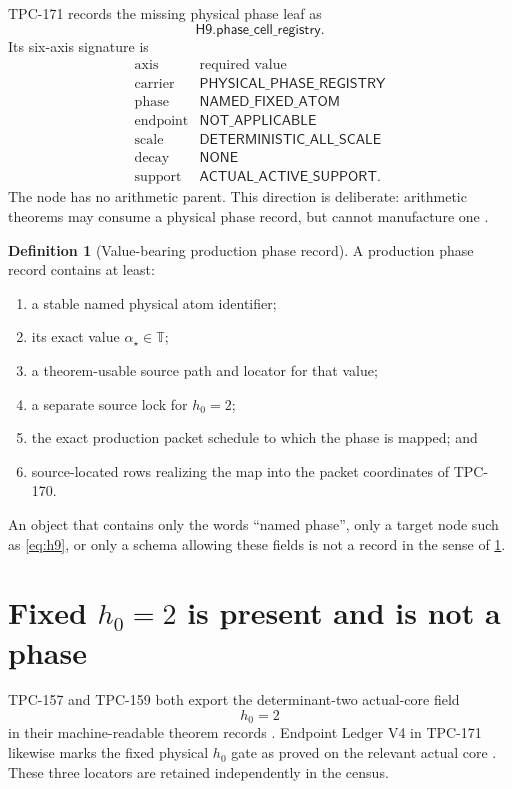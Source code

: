 \documentclass[11pt]{article}
\theoremstyle{definition}
\newtheorem{definition}[theorem]{Definition}
\theoremstyle{remark}
\newcommand{\T}{\mathbb T}
\begin{document}
TPC-171 records the missing physical phase leaf as
\[
 \mathsf{H9.phase\_cell\_registry}.
\tag{1}\label{eq:h9}
\]
Its six-axis signature is
\[
\begin{array}{c|c}
\text{axis}&\text{required value}\\
\hline
\text{carrier}&\mathsf{PHYSICAL\_PHASE\_REGISTRY}\\
\text{phase}&\mathsf{NAMED\_FIXED\_ATOM}\\
\text{endpoint}&\mathsf{NOT\_APPLICABLE}\\
\text{scale}&\mathsf{DETERMINISTIC\_ALL\_SCALE}\\
\text{decay}&\mathsf{NONE}\\
\text{support}&\mathsf{ACTUAL\_ACTIVE\_SUPPORT}.
\end{array}
\tag{2}\label{eq:signature}
\]
The node has no arithmetic parent.  This direction is deliberate:
arithmetic theorems may consume a physical phase record, but cannot
manufacture one \citep{WangTPC161,WangTPC171}.

\begin{definition}[Value-bearing production phase record]
\label{def:record}
A production phase record contains at least:
\begin{enumerate}[label=(\roman*),leftmargin=2.2em]
\item a stable named physical atom identifier;
\item its exact value \(\alpha_\star\in\T\);
\item a theorem-usable source path and locator for that value;
\item a separate source lock for \(h_0=2\);
\item the exact production packet schedule to which the phase is
  mapped; and
\item source-located rows realizing the map into the packet
  coordinates of TPC-170.
\end{enumerate}
\end{definition}

An object that contains only the words ``named phase'', only a target
node such as \eqref{eq:h9}, or only a schema allowing these fields is
not a record in the sense of \cref{def:record}.

\section{\texorpdfstring{Fixed \(h_0=2\)}{Fixed h0=2} is present and is not a phase}

TPC-157 and TPC-159 both export the determinant-two actual-core field
\[
 h_0=2
\tag{3}\label{eq:h0}
\]
in their machine-readable theorem records
\citep{WangTPC157,WangTPC159}.  Endpoint Ledger V4 in TPC-171 likewise
marks the fixed physical \(h_0\) gate as proved on the relevant actual
core \citep{WangTPC171}.  These three locators are retained
independently in the census.
\end{document}
